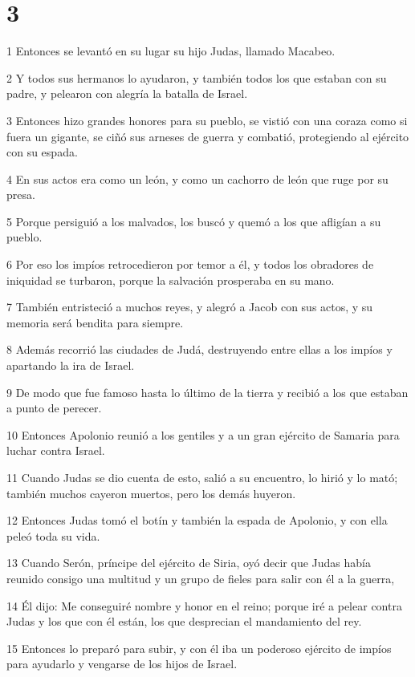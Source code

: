 \chapter{3}

\par 1 Entonces se levantó en su lugar su hijo Judas, llamado Macabeo.
\par 2 Y todos sus hermanos lo ayudaron, y también todos los que estaban con su padre, y pelearon con alegría la batalla de Israel.
\par 3 Entonces hizo grandes honores para su pueblo, se vistió con una coraza como si fuera un gigante, se ciñó sus arneses de guerra y combatió, protegiendo al ejército con su espada.
\par 4 En sus actos era como un león, y como un cachorro de león que ruge por su presa.
\par 5 Porque persiguió a los malvados, los buscó y quemó a los que afligían a su pueblo.
\par 6 Por eso los impíos retrocedieron por temor a él, y todos los obradores de iniquidad se turbaron, porque la salvación prosperaba en su mano.
\par 7 También entristeció a muchos reyes, y alegró a Jacob con sus actos, y su memoria será bendita para siempre.
\par 8 Además recorrió las ciudades de Judá, destruyendo entre ellas a los impíos y apartando la ira de Israel.
\par 9 De modo que fue famoso hasta lo último de la tierra y recibió a los que estaban a punto de perecer.
\par 10 Entonces Apolonio reunió a los gentiles y a un gran ejército de Samaria para luchar contra Israel.
\par 11 Cuando Judas se dio cuenta de esto, salió a su encuentro, lo hirió y lo mató; también muchos cayeron muertos, pero los demás huyeron.
\par 12 Entonces Judas tomó el botín y también la espada de Apolonio, y con ella peleó toda su vida.
\par 13 Cuando Serón, príncipe del ejército de Siria, oyó decir que Judas había reunido consigo una multitud y un grupo de fieles para salir con él a la guerra,
\par 14 Él dijo: Me conseguiré nombre y honor en el reino; porque iré a pelear contra Judas y los que con él están, los que desprecian el mandamiento del rey.
\par 15 Entonces lo preparó para subir, y con él iba un poderoso ejército de impíos para ayudarlo y vengarse de los hijos de Israel.
